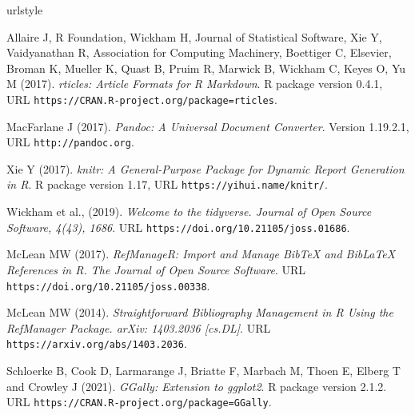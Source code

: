 \documentclass[letterpaper,8pt,twocolumn,twoside,]{pinp}
\begin{document}
\begin{thebibliography}{3}
\newcommand{\enquote}[1]{``#1''}
\providecommand{\natexlab}[1]{#1}
\providecommand{\url}[1]{\texttt{#1}}
\providecommand{\urlprefix}{URL }
\expandafter\ifx\csname urlstyle\endcsname\relax
  \providecommand{\doi}[1]{doi:\discretionary{}{}{}#1}\else
  \providecommand{\doi}{doi:\discretionary{}{}{}\begingroup
  \urlstyle{rm}\Url}\fi
\providecommand{\eprint}[2][]{\url{#2}}

Allaire J, {R Foundation}, Wickham H, {Journal of Statistical Software}, Xie Y,
  Vaidyanathan R, {Association for Computing Machinery}, Boettiger C,
  {Elsevier}, Broman K, Mueller K, Quast B, Pruim R, Marwick B, Wickham C,
  Keyes O, Yu M (2017).
\newblock \emph{rticles: Article Formats for R Markdown}.
\newblock R package version 0.4.1,
  \urlprefix\url{https://CRAN.R-project.org/package=rticles}.

MacFarlane J (2017).
\newblock \emph{Pandoc: A Universal Document Converter}.
\newblock Version 1.19.2.1, \urlprefix\url{http://pandoc.org}.

\bibitem[{Xie Y (2017)}]{}
Xie Y (2017).
\newblock \emph{knitr: A General-Purpose Package for Dynamic Report Generation
  in R}.
\newblock R package version 1.17, \urlprefix\url{https://yihui.name/knitr/}.

\bibitem[{Wickham et al., (2019)}]{}
Wickham et al., (2019).
\newblock \emph{Welcome to the tidyverse. Journal of Open
Source Software, 4(43), 1686}.
\newblock \urlprefix\url{https://doi.org/10.21105/joss.01686}.

\bibitem[{McLean MW(2017)}]{}
McLean MW (2017).
\newblock \emph{RefManageR: Import and Manage BibTeX and BibLaTeX
References in R. The Journal of Open Source Software}.
\newblock \urlprefix\url{https://doi.org/10.21105/joss.00338}.

\bibitem[{McLean MW (2014)}]{}
McLean MW (2014).
\newblock \emph{Straightforward Bibliography Management in R
Using the RefManager Package. arXiv: 1403.2036 [cs.DL]{}}.
\newblock \urlprefix\url{https://arxiv.org/abs/1403.2036}.

Schloerke B, Cook D, Larmarange J, Briatte F,
Marbach M, Thoen E, Elberg T and Crowley J (2021).
\newblock \emph{GGally: Extension to ggplot2}.
\newblock R package version 2.1.2. \urlprefix\url{https://CRAN.R-project.org/package=GGally}.


\end{thebibliography}
\end{document}

